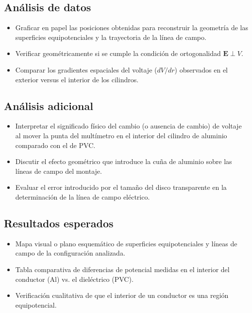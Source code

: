 \subsection{Análisis de datos}

\begin{itemize}
\item Graficar en papel las posiciones obtenidas para reconstruir la geometría de las superficies equipotenciales y la trayectoria de la línea de campo.
\item Verificar geométricamente si se cumple la condición de ortogonalidad $\mathbf{E} \perp V$.
\item Comparar los gradientes espaciales del voltaje ($dV/dr$) observados en el exterior versus el interior de los cilindros.
\end{itemize}

\subsection{Análisis adicional}

\begin{itemize}
\item Interpretar el significado físico del cambio (o ausencia de cambio) de voltaje al mover la punta del multímetro en el interior del cilindro de aluminio comparado con el de PVC.
\item Discutir el efecto geométrico que introduce la cuña de aluminio sobre las líneas de campo del montaje.
\item Evaluar el error introducido por el tamaño del disco transparente en la determinación de la línea de campo eléctrico.
\end{itemize}

\subsection{Resultados esperados}

\begin{itemize}
\item Mapa visual o plano esquemático de superficies equipotenciales y líneas de campo de la configuración analizada.
\item Tabla comparativa de diferencias de potencial medidas en el interior del conductor (Al) vs. el dieléctrico (PVC).
\item Verificación cualitativa de que el interior de un conductor es una región equipotencial.
\end{itemize}

